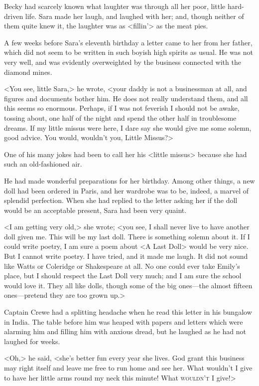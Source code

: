 Becky had scarcely known what laughter was through all her poor, little hard-driven life. Sara made her laugh, and laughed with her; and, though neither of them quite knew it, the laughter was as <fillin'> as the meat pies.

A few weeks before Sara's eleventh birthday a letter came to her from her father, which did not seem to be written in such boyish high spirits as usual. He was not very well, and was evidently overweighted by the business connected with the diamond mines.

<You see, little Sara,> he wrote, <your daddy is not a businessman at all, and figures and documents bother him. He does not really understand them, and all this seems so enormous. Perhaps, if I was not feverish I should not be awake, tossing about, one half of the night and spend the other half in troublesome dreams. If my little missus were here, I dare say she would give me some solemn, good advice. You would, wouldn't you, Little Missus?>

One of his many jokes had been to call her his <little missus> because she had such an old-fashioned air.

He had made wonderful preparations for her birthday. Among other things, a new doll had been ordered in Paris, and her wardrobe was to be, indeed, a marvel of splendid perfection. When she had replied to the letter asking her if the doll would be an acceptable present, Sara had been very quaint.

<I am getting very old,> she wrote; <you see, I shall never live to have another doll given me. This will be my last doll. There is something solemn about it. If I could write poetry, I am sure a poem about <A Last Doll> would be very nice. But I cannot write poetry. I have tried, and it made me laugh. It did not sound like Watts or Coleridge or Shakespeare at all. No one could ever take Emily's place, but I should respect the Last Doll very much; and I am sure the school would love it. They all like dolls, though some of the big ones—the almost fifteen ones—pretend they are too grown up.>

Captain Crewe had a splitting headache when he read this letter in his bungalow in India. The table before him was heaped with papers and letters which were alarming him and filling him with anxious dread, but he laughed as he had not laughed for weeks.

<Oh,> he said, <she's better fun every year she lives. God grant this business may right itself and leave me free to run home and see her. What wouldn't I give to have her little arms round my neck this minute! What \textsc{wouldn't} I give!>

